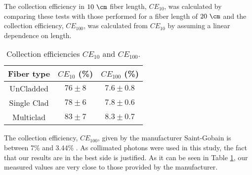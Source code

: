


The collection efficiency in $10~\cm$ fiber length, $CE_{10}$, was calculated by comparing these tests with those performed for a fiber length of $20~\cm$ and the collection efficiency, $CE_{100}$, was calculated from $CE_{10}$ by assuming a linear dependence on length.

\begin{table}[htbp]
\begin{center}
\begin{tabular}{|c|c|c|}
\hline
Fiber type & $CE_{10}$ (\%) & $CE_{100}$ (\%) \\\hline \hline \hline
UnCladded & $76 \pm 8$ & $7.6 \pm 0.8$ \\ \hline
Single Clad & $78 \pm 6$ & $7.8 \pm 0.6$ \\ \hline
Multiclad & $83 \pm 7$ & $8.3 \pm 0.7$ \\ \hline
\end{tabular}
\caption{Collection efficiencies $CE_{10}$ and $CE_{100}$.}
\label{tab:CollectionEfficiencyOfFibers}
\end{center}
\end{table}


The collection efficiency, $CE_{100}$, given by the manufacturer Saint-Gobain is between 7\% and 3.44\% \cite{DataSheetBCF12Fiber}. As collimated photons were used in this study, the fact that our results are in the best side is justified. As it can be seen in Table \ref{tab:CollectionEfficiencyOfFibers}, our measured values are very close to those provided by the manufacturer. %
